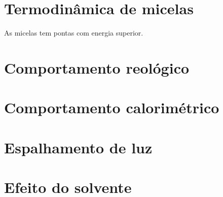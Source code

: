 		\section{Termodinâmica de micelas}
		As micelas tem pontas com energia superior.
		\section{Comportamento reológico}
		\section{Comportamento calorimétrico}
		
		\section{Espalhamento de luz}
		\section{Efeito do solvente}
		\label{sec:efeito_solvente}
		
